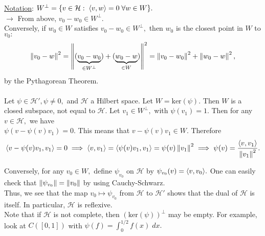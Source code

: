 \noindent \underline{Notation}: $W^{\perp}=\{v\in\mathcal{H}:\;\langle v,w\rangle=0\;\forall w\in W\}.$ \\

\noindent $\rightarrow$ From above, $v_0-w_0\in W^{\perp}.$ \\
\noindent Conversely, if $w_0\in W$ satisfies $v_0-w_0\in W^{\perp},$ then $w_0$ is the closest point in $W$ to $v_0:$ 
$$\left\lVert v_0-w\right\rVert^2=\left\lVert(\underbrace{v_0-w_0}_{\in W^{\perp}})+(\underbrace{w_0-w}_{\in W})\right\rVert^2=\left\lVert v_0-w_0\right\rVert^2+\left\lVert w_0-w\right\rVert^2,$$
by the Pythagorean Theorem. \\


\noindent {} \\
Let $\psi\in\mathcal{H}', \psi\neq 0,$ and $\mathcal{H}$ a Hilbert space. Let $W=\text{ker}(\psi).$ Then $W$ is a closed subspace, not equal to $\mathcal{H}.$ Let $v_1\in W^{\perp},$ with $\psi(v_1)=1.$ Then for any $v\in\mathcal{H},$ we have \\ $\psi(v-\psi(v)v_1)=0.$ This means that $v-\psi(v)v_1\in W.$ Therefore
$$\langle v-\psi(v)v_1,v_1\rangle=0\implies \langle v,v_1\rangle=\langle \psi(v)v_1,v_1\rangle=\psi(v)\left\lVert v_1\right\rVert^2\implies \psi(v)=\frac{\langle v,v_1\rangle}{\left\lVert v_1\right\rVert^2}.$$

\noindent Conversely, for any $v_0\in W,$ define $\psi_{v_0}$ on $\mathcal{H}$ by $\psi_{v_0}(v)=\langle v,v_0\rangle.$ One can easily check that $\left\lVert\psi_{v_0}\right\rVert=\left\lVert v_0\right\rVert$ by using Cauchy-Schwarz. \\
\noindent Thus, we see that the map $v_0\mapsto \psi_{v_0}$ from $\mathcal{H}$ to $\mathcal{H}'$ shows that the dual of $\mathcal{H}$ is itself. In particular, $\mathcal{H}$ is reflexive. \\

\noindent * Note that if $\mathcal{H}$ is not complete, then $(\text{ker}(\psi))^{\perp}$ may be empty. For example, look at $C([0,1])$ with $\psi(f)=\int_0^{1/2}f(x)\;dx.$




